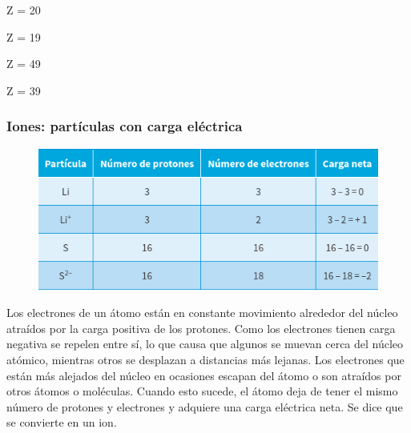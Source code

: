 \documentclass[11pt]{book}
\begin{document}
\begin{boxK}
\begin{enumerate}
          \begin{hoptboxes}
            \item Z = 20
            \item Z = 19
            \item Z = 49
            \item Z = 39
          \end{hoptboxes}

  \end{enumerate}

\end{boxK}
\subsubsection{Iones: partículas con carga eléctrica}

\begin{figure}[H]
  \centering
  \includegraphics[width=0.7\linewidth]{tabla_de_cargas.png}
  \label{tab:tabla_de_cargas}
\end{figure}%

Los electrones de un átomo están en constante movimiento alrededor del núcleo atraídos por la carga positiva
de los protones. Como los electrones tienen carga negativa se repelen entre sí, lo que causa que algunos se
muevan cerca del núcleo atómico, mientras otros se desplazan a distancias más lejanas. Los electrones que están
más alejados del núcleo en ocasiones escapan del átomo o son atraídos por otros átomos o moléculas. Cuando esto
sucede, el átomo deja de tener el mismo número de protones y electrones y adquiere una carga eléctrica neta.
Se dice que se convierte en un ion.
\end{document}
